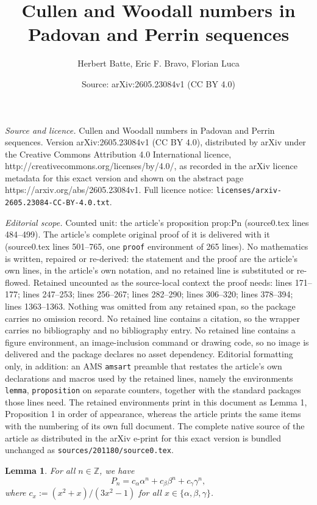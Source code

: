 \documentclass[10pt,a4paper]{amsart}
\title{Cullen and Woodall numbers in Padovan and Perrin sequences}
\author{Herbert Batte, Eric F. Bravo, Florian Luca}
\date{Source: arXiv:2605.23084v1 (CC BY 4.0)}
\newtheorem{lemma}{Lemma}
\begin{document}
\maketitle

\noindent\emph{Source and licence.} Cullen and Woodall numbers in Padovan and Perrin sequences. Version arXiv:2605.23084v1 (CC BY 4.0), distributed by arXiv under the Creative Commons Attribution 4.0 International licence, http://creativecommons.org/licenses/by/4.0/, as recorded in the arXiv licence metadata for this exact version and shown on the abstract page https://arxiv.org/abs/2605.23084v1. Full licence notice: \texttt{licenses/arxiv-2605.23084-CC-BY-4.0.txt}.\par\smallskip

\noindent\textit{Editorial scope.} Counted unit: the article's proposition prop:Pn (source0.tex lines 484--499). The article's complete original proof of it is delivered with it (source0.tex lines 501--765, one \texttt{proof} environment of 265 lines). No mathematics is written, repaired or re-derived: the statement and the proof are the article's own lines, in the article's own notation, and no retained line is substituted or re-flowed.  Retained uncounted as the source-local context the proof needs: lines 171--177; lines 247--253; lines 256--267; lines 282--290; lines 306--320; lines 378--394; lines 1363--1363.  Nothing was omitted from any retained span, so the package carries no omission record.  No retained line contains a citation, so the wrapper carries no bibliography and no bibliography entry.  No retained line contains a figure environment, an image-inclusion command or drawing code, so no image is delivered and the package declares no asset dependency.  Editorial formatting only, in addition: an AMS \texttt{amsart} preamble that restates the article's own declarations and macros used by the retained lines, namely the environments \texttt{lemma}, \texttt{proposition} on separate counters, together with the standard packages those lines need.  The retained environments print in this document as Lemma 1, Proposition 1 in order of appearance, whereas the article prints the same items with the numbering of its own full document.  The complete native source of the article as distributed in the arXiv e-print for this exact version is bundled unchanged as \texttt{sources/201180/source0.tex}.
\begin{lemma}\label{eq:binet_padovan}
For all $n \in \mathbb{Z}$, we have
\begin{equation*}
	P_n = c_{\alpha}\alpha^n + c_{\beta}\beta^n + c_{\gamma}\gamma^n,
\end{equation*}
where $c_{x}:=(x^{2}+x)/(3x^{2}-1)$ for all $x\in \{\alpha,\beta, \gamma\}$.  
\end{lemma}
\end{document}
